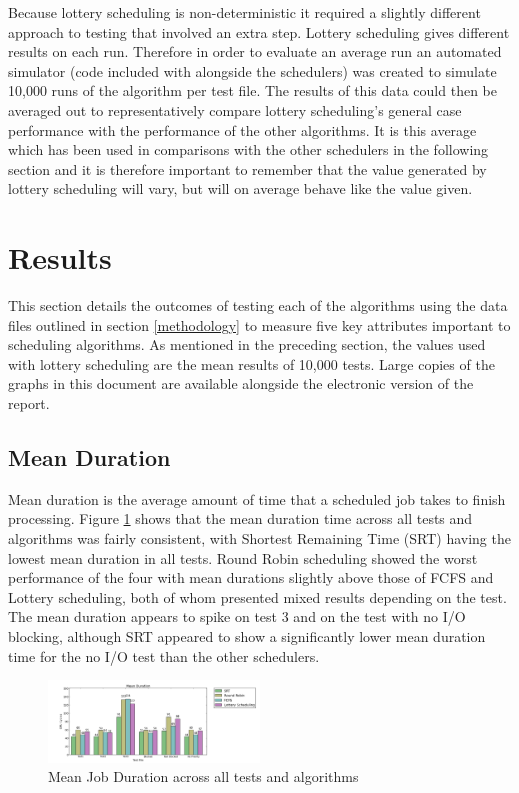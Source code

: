 \documentclass{acm_proc_article-sp}
\begin{document}
Because lottery scheduling is non-deterministic it required a slightly different approach to testing that involved an extra step. Lottery scheduling gives different results on each run. Therefore in order to evaluate an average run an automated simulator (code included with alongside the schedulers) was created to simulate 10,000 runs of the algorithm per test file. The results of this data could then be averaged out to representatively compare lottery scheduling's general case performance with the performance of the other algorithms. It is this average which has been used in comparisons with the other schedulers in the following section and it is therefore important to remember that the value generated by lottery scheduling will vary, but will on average behave like the value given.

\section{Results}
\label{results}
This section details the outcomes of testing each of the algorithms using the data files outlined in section \ref{methodology} to measure five key attributes important to scheduling algorithms. As mentioned in the preceding section, the values used with lottery scheduling are the mean results of 10,000 tests. Large copies of the graphs in this document are available alongside the electronic version of the report.

\subsection{Mean Duration}
\label{results-duration}
Mean duration is the average amount of time that a scheduled job takes to finish processing. Figure \ref{fig:duration} shows that the mean duration time across all tests and algorithms was fairly consistent, with Shortest Remaining Time (SRT) having the lowest mean duration in all tests. Round Robin scheduling showed the worst performance of the four with mean durations slightly above those of FCFS and Lottery scheduling, both of whom presented mixed results depending on the test. The mean duration appears to spike on test 3 and on the test with no I/O blocking, although SRT appeared to show a significantly lower mean duration time for the no I/O test than the other schedulers.


\begin{figure}[H]
\centering
\includegraphics[width=0.5\textwidth]{duration.png}
\caption{Mean Job Duration across all tests and algorithms}
\label{fig:duration}
\end{figure}
\end{document}
